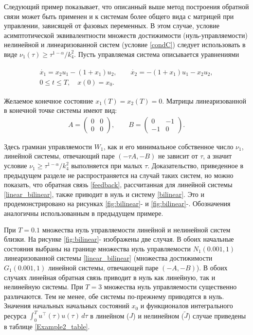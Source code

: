 \documentclass[../main.tex]{subfiles}
\begin{document}
	\begin{pr}
	Следующий пример показывает, что описанный выше метод построения обратной связи может быть применен и к системам более общего вида с матрицей при управлении, зависящей от фазовых переменных. В этом случае, условие  асимптотической эквивалентности  множеств достижимости (нуль-управляемости) нелинейной и линеаризованной систем (условие \ref{condC}) следует использовать в виде $ \nu_1(\tau) \geqslant \tau^{1 - \alpha} / k_4^2 $.   Пусть управляемая  система описывается уравнениями
	
	\begin{gather}\label{bilinear}
	\begin{gathered}
		\dot{x_1} = x_2 u_1 - (1 + x_1) u_2, \qquad \dot{x_2} = -(1+x_1) u_1 - x_2 u_2, \\
		0 \leqslant t \leqslant T, \quad
		x(0) = x_0.
		\end{gathered}
	\end{gather}
	
	Желаемое конечное состояние $ x_1(T) = x_2(T) =  0 $. Матрицы линеаризованной в конечной точке системы имеют вид:
	\begin{gather}\label{linear_bilinear}
		A = \begin{pmatrix}
			0 & 0\\
			0 & 0
		\end{pmatrix}, \qquad 
		B = \begin{pmatrix}
			0 & -1 \\
			-1 & 0
		\end{pmatrix}.
	\end{gather}
	 
	Здесь грамиан управляемости $ W_1 $, как и его минимальное собственное число $ \nu_1 $, линейной системы, отвечающий паре  $(-\tau A, -B) $ не зависит от $ \tau $, а значит условие $ \nu_1 \geqslant \tau^{1 - \alpha} / k_4^2 $ выполняется при малых $\tau$. Доказательство, приведенное в предыдущем разделе не распространяется на случай таких систем, но можно показать, что обратная связь \eqref{feedback}, рассчитанная для линейной системы \eqref{linear_bilinear},  также приводит в нуль и систему \eqref{bilinear}. Это и продемонстрировано на рисунках \ref{fig:bilinear}- и \ref{fig:bilinear}-. Обозначения аналогичны использованным в предыдущем примере. 
	
	При $T = 0.1 $ множества нуль управляемости линейной и нелинейной систем близки. На рисунке \ref{fig:bilinear}- изображены две случая. В обоих начальные состояния выбраны на границе множества нуль управляемости $N_1(0.001,1)$  линеаризованной системы \eqref{linear_bilinear} (множества достижимости $G_1(0.001,1)$ линейной системы, отвечающей паре $(-A,-B)$). В обоих случаях линейная обратная связь приводит в нуль как линейную, так и нелинейную системы. При $ T = 3 $ множества нуль управляемости существенно различаются. Тем не менее, обе системы по-прежнему приводятся в нуль. Значения начальных начальных состояний $x_0$ и функционалов интегрального ресурса $ \displaystyle{\int_0^T u^{\top}(\tau) u(\tau) \, d\tau}$ в линейном ($ J $) и нелинейном ($ \widetilde{J} $) случае  приведены в таблице \ref{Example2_table}.
	\end{pr}
\end{document}
